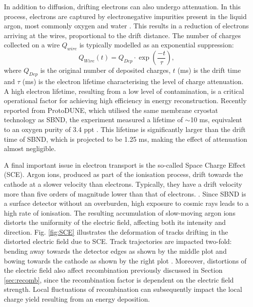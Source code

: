 In addition to diffusion, drifting electrons can also undergo attenuation.  
In this process, electrons are captured by electronegative impurities present in the liquid argon, most commonly oxygen and water \cite{protodune}.
This results in a reduction of electrons arriving at the wires, proportional to the drift distance. 
The number of charges collected on a wire $Q_{wire}$ is typically modelled as an exponential suppression:
\begin{equation}
	Q_{Wire} (t) = Q_{Dep} \cdot \exp\left(\frac{-t}{\tau}\right),
\label{eq:etime}
\end{equation}
where $Q_{Dep}$ is the original number of deposited charges, $t$ (ms) is the drift time and $\tau$ (ms) is the electron lifetime characterising the level of charge attenuation.
A high electron lifetime, resulting from a low level of contamination, is a critical operational factor for achieving high efficiency in energy reconstruction.
Recently reported from ProtoDUNE, which utilised the same membrane cryostat technology as SBND, the experiment measured a lifetime of $\sim$10 ms, equivalent to an oxygen purity of 3.4 ppt \cite{protodune}.
This lifetime is significantly larger than the drift time of SBND, which is projected to be 1.25 ms, making the effect of attenuation almost negligible. 



A final important issue in electron transport is the so-called Space Charge Effect (SCE).
Argon ions, produced as part of the ionisation process, drift towards the cathode at a slower velocity than electrons.
Typically, they have a drift velocity more than five orders of magnitude lower than that of electrons. \cite{icarus_sce}.
Since SBND is a surface detector without an overburden, high exposure to cosmic rays leads to a high rate of ionisation.
The resulting accumulation of slow-moving argon ions distorts the uniformity of the electric field, affecting both its intensity and direction.
Fig. \ref{fig:SCE} illustrates the deformation of tracks drifting in the distorted electric field due to SCE.
Track trajectories are impacted two-fold: bending away towards the detector edges as shown by the middle plot and bowing towards the cathode as shown by the right plot \cite{SCE}.
Moreover, distortions of the electric field also affect recombination previously discussed in Section \ref{sec:recomb}, since the recombination factor is dependent on the electric field strength.
Local fluctuations of recombination can subsequently impact the local charge yield resulting from an energy deposition.

